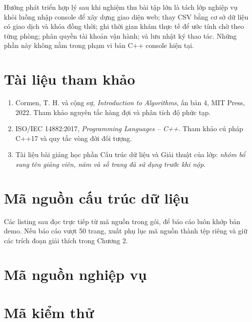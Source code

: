 \documentclass[12pt,a4paper,oneside]{report}
\begin{document}
Hướng phát triển hợp lý sau khi nghiệm thu bài tập lớn là tách lớp nghiệp vụ khỏi luồng nhập console để xây dựng giao diện web; thay CSV bằng cơ sở dữ liệu có giao dịch và khóa đồng thời; ghi thời gian khám thực tế để ước tính chờ theo từng phòng; phân quyền tài khoản vận hành; và lưu nhật ký thao tác. Những phần này không nằm trong phạm vi bản C++ console hiện tại.

\chapter*{Tài liệu tham khảo}
\begin{enumerate}
\item Cormen, T. H. và cộng sự, \textit{Introduction to Algorithms}, ấn bản 4, MIT Press, 2022. Tham khảo nguyên tắc hàng đợi và phân tích độ phức tạp.
\item ISO/IEC 14882:2017, \textit{Programming Languages -- C++}. Tham khảo cú pháp C++17 và quy tắc vòng đời đối tượng.
\item Tài liệu bài giảng học phần Cấu trúc dữ liệu và Giải thuật của lớp: \textit{nhóm bổ sung tên giảng viên, năm và số trang đã sử dụng trước khi nộp}.
\end{enumerate}

\appendix
\chapter{Mã nguồn cấu trúc dữ liệu}
Các listing sau đọc trực tiếp từ mã nguồn trong gói, để báo cáo luôn khớp bản demo. Nếu báo cáo vượt 50 trang, xuất phụ lục mã nguồn thành tệp riêng và giữ các trích đoạn giải thích trong Chương 2.






\chapter{Mã nguồn nghiệp vụ}







\chapter{Mã kiểm thử}

\end{document}
